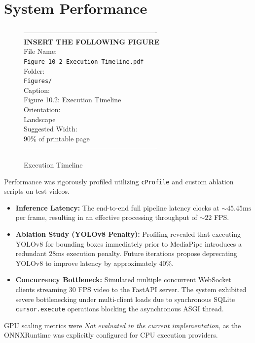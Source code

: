 \section{System Performance}
\begin{figure}[htbp]
\begin{center}
----------------------------------------------------------\\
\vspace{0.5em}
\textbf{INSERT THE FOLLOWING FIGURE}\\
\vspace{1em}
File Name:\\
\texttt{Figure\_10\_2\_Execution\_Timeline.pdf}\\
\vspace{1em}
Folder:\\
\texttt{Figures/}\\
\vspace{1em}
Caption:\\
Figure 10.2: Execution Timeline\\
\vspace{1em}
Orientation:\\
Landscape\\
\vspace{1em}
Suggested Width:\\
90\% of printable page\\
\vspace{3cm}
----------------------------------------------------------
\end{center}
\caption{Execution Timeline}
\label{fig:diag_16}
\end{figure}
Performance was rigorously profiled utilizing \texttt{cProfile} and custom ablation scripts on test videos.
\begin{itemize}
    \item \textbf{Inference Latency:} The end-to-end full pipeline latency clocks at $\sim45.45\text{ms}$ per frame, resulting in an effective processing throughput of $\sim22$ FPS.
    \item \textbf{Ablation Study (YOLOv8 Penalty):} Profiling revealed that executing YOLOv8 for bounding boxes immediately prior to MediaPipe introduces a redundant 28ms execution penalty. Future iterations propose deprecating YOLOv8 to improve latency by approximately $40\%$.
    \item \textbf{Concurrency Bottleneck:} Simulated multiple concurrent WebSocket clients streaming 30 FPS video to the FastAPI server. The system exhibited severe bottlenecking under multi-client loads due to synchronous SQLite \texttt{cursor.execute} operations blocking the asynchronous ASGI thread.
\end{itemize}
GPU scaling metrics were \textit{Not evaluated in the current implementation}, as the ONNXRuntime was explicitly configured for CPU execution providers.


